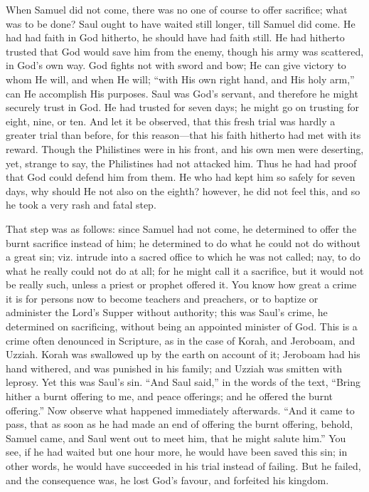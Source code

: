 When Samuel did not come, there was no one of course to offer
sacrifice; what was to be done? Saul ought to have waited still
longer, till Samuel did come. He had had faith in God hitherto, he
should have had faith still. He had hitherto trusted that God would
save him from the enemy, though his army was scattered, in God's own
way. God fights not with sword and bow; He can give victory to whom He
will, and when He will; ``with His own right hand, and His holy
arm,'' can He accomplish His purposes. Saul was God's servant, and
therefore he might securely trust in God. He had trusted for seven
days; he might go on trusting for eight, nine, or ten. And let it be
observed, that this fresh trial was hardly a greater trial than
before, for this reason—that his faith hitherto had met with its
reward. Though the Philistines were in his front, and his own men were
deserting, yet, strange to say, the Philistines had not attacked him.
Thus he had had proof that God could defend him from them. He who had
kept him so safely for seven days, why should He not also on the
eighth? however, he did not feel this, and so he took a very rash and
fatal step.

That step was as follows: since Samuel had not come, he determined
to offer the burnt sacrifice instead of him; he determined to do what
he could not do without a great sin; viz. intrude into a sacred office
to which he was not called; nay, to do what he really could not do at
all; for he might call it a sacrifice, but it would not be really
such, unless a priest or prophet offered it. You know how great a
crime it is for persons now to become teachers and preachers, or to
baptize or administer the Lord's Supper without authority; this was
Saul's crime, he determined on sacrificing, without being an appointed
minister of God. This is a crime often denounced in Scripture, as in
the case of Korah, and Jeroboam, and Uzziah. Korah was swallowed up by
the earth on account of it; Jeroboam had his hand withered, and was
punished in his family; and Uzziah was smitten with leprosy. Yet this
was Saul's sin. ``And Saul said,'' in the words of the text,
``Bring hither a burnt offering to me, and peace offerings; and he
offered the burnt offering.'' Now observe what happened
immediately afterwards. ``And it came to pass, that as soon as he
had made an end of offering the burnt offering, behold, Samuel came,
and Saul went out to meet him, that he might salute him.'' You
see, if he had waited but one hour more, he would have been saved this
sin; in other words, he would have succeeded in his trial instead of
failing. But he failed, and the consequence was, he lost God's favour,
and forfeited his kingdom.

